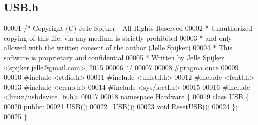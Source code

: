 \hypertarget{_u_s_b_8h_source}{}\subsection{U\+S\+B.\+h}
\label{_u_s_b_8h_source}

\begin{DoxyCode}
00001 \textcolor{comment}{/* Copyright (C) Jelle Spijker - All Rights Reserved}
00002 \textcolor{comment}{ * Unauthorized copying of this file, via any medium is strictly prohibited}
00003 \textcolor{comment}{ * and only allowed with the written consent of the author (Jelle Spijker)}
00004 \textcolor{comment}{ * This software is proprietary and confidential}
00005 \textcolor{comment}{ * Written by Jelle Spijker <spijker.jelle@gmail.com>, 2015}
00006 \textcolor{comment}{ */}
00007 
00008 \textcolor{preprocessor}{#pragma once}
00009 
00010 \textcolor{preprocessor}{#include <stdio.h>}
00011 \textcolor{preprocessor}{#include <unistd.h>}
00012 \textcolor{preprocessor}{#include <fcntl.h>}
00013 \textcolor{preprocessor}{#include <errno.h>}
00014 \textcolor{preprocessor}{#include <sys/ioctl.h>}
00015 
00016 \textcolor{preprocessor}{#include <linux/usbdevice\_fs.h>}
00017 
00018 \textcolor{keyword}{namespace }\hyperlink{namespace_hardware}{Hardware} \{
\hypertarget{_u_s_b_8h_source_l00019}{}\hyperlink{class_hardware_1_1_u_s_b}{00019} \textcolor{keyword}{class }\hyperlink{class_hardware_1_1_u_s_b}{USB} \{
00020 \textcolor{keyword}{public}:
00021   \hyperlink{class_hardware_1_1_u_s_b_a225d2d24d36cc7c4e46f5c4d19f51fb8}{USB}();
00022   \hyperlink{class_hardware_1_1_u_s_b_a808f13d66ce9bdf66a043fd02b4b8cf2}{~USB}();
00023   \textcolor{keywordtype}{void} \hyperlink{class_hardware_1_1_u_s_b_af387867ec84f4c709b55e3605f9e313e}{ResetUSB}();
00024 \};
00025 \}
\end{DoxyCode}
